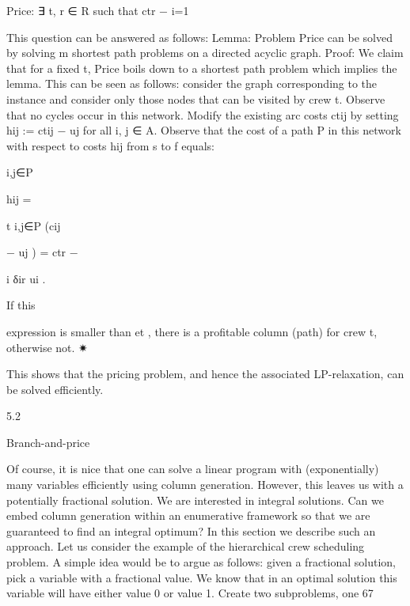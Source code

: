 Price: ∃ t, r ∈ R such that ctr −
i=1

This question can be answered as follows:
Lemma: Problem Price can be solved by solving m shortest path problems on a directed acyclic graph.
Proof: We claim that for a fixed t, Price boils down to a shortest path problem which implies the lemma.
This can be seen as follows: consider the graph corresponding to the instance and consider only those
nodes that can be visited by crew t. Observe that no cycles occur in this network. Modify the existing
arc costs ctij by setting hij := ctij − uj for all {i, j} ∈ A. Observe that the cost of a path P in this network
with respect to costs hij from s to f equals:

{i,j}∈P

hij =

t
{i,j}∈P (cij

− uj ) = ctr −

i δir ui .

If this

expression is smaller than et , there is a profitable column (path) for crew t, otherwise not.
✷

This shows that the pricing problem, and hence the associated LP-relaxation, can be solved efficiently.

5.2

Branch-and-price

Of course, it is nice that one can solve a linear program with (exponentially) many variables efficiently
using column generation. However, this leaves us with a potentially fractional solution. We are interested
in integral solutions. Can we embed column generation within an enumerative framework so that we are
guaranteed to find an integral optimum? In this section we describe such an approach.
Let us consider the example of the hierarchical crew scheduling problem. A simple idea would be to
argue as follows: given a fractional solution, pick a variable with a fractional value. We know that
in an optimal solution this variable will have either value 0 or value 1. Create two subproblems, one
67

